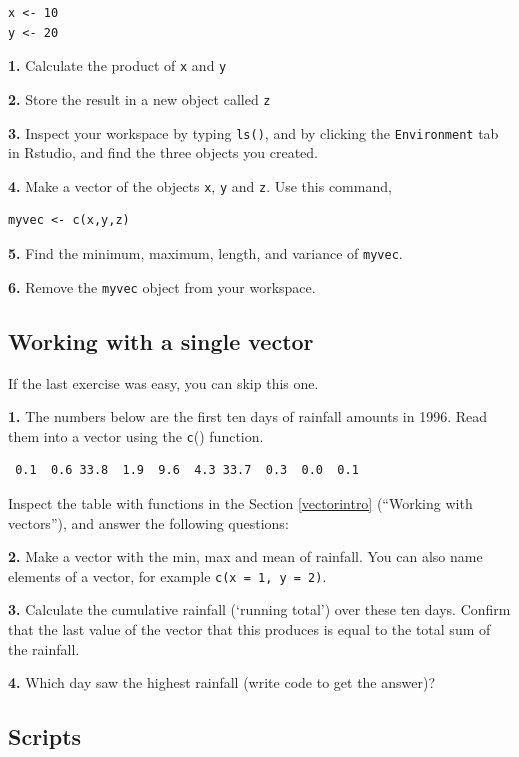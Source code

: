 \documentclass[]{book}
\begin{document}
\begin{verbatim}
x <- 10
y <- 20
\end{verbatim}

\textbf{1.} Calculate the product of \texttt{x} and \texttt{y}

\textbf{2.} Store the result in a new object called \texttt{z}

\textbf{3.} Inspect your workspace by typing \texttt{ls()}, and by clicking the \texttt{Environment} tab in Rstudio, and find the three objects you created.

\textbf{4.} Make a vector of the objects \texttt{x}, \texttt{y} and \texttt{z}. Use this command,

\begin{verbatim}
myvec <- c(x,y,z)
\end{verbatim}

\textbf{5.} Find the minimum, maximum, length, and variance of \texttt{myvec}.

\textbf{6.} Remove the \texttt{myvec} object from your workspace.

\hypertarget{vecexerc1}{%
\subsection{Working with a single vector}\label{vecexerc1}}

If the last exercise was easy, you can skip this one.

\textbf{1.} The numbers below are the first ten days of rainfall amounts in 1996. Read them into a vector using the \texttt{c}() function.

\begin{verbatim}
 0.1  0.6 33.8  1.9  9.6  4.3 33.7  0.3  0.0  0.1
\end{verbatim}

Inspect the table with functions in the Section \ref{vectorintro} (``Working with vectors''), and answer the following questions:

\textbf{2.} Make a vector with the min, max and mean of rainfall. You can also name elements of a vector, for example \texttt{c(x\ =\ 1,\ y\ =\ 2)}.

\textbf{3.} Calculate the cumulative rainfall (`running total') over these ten days. Confirm that the last value of the vector that this produces is equal to the total sum of the rainfall.

\textbf{4.} Which day saw the highest rainfall (write code to get the answer)?

\hypertarget{scriptexercise}{%
\subsection{Scripts}\label{scriptexercise}}
\end{document}
